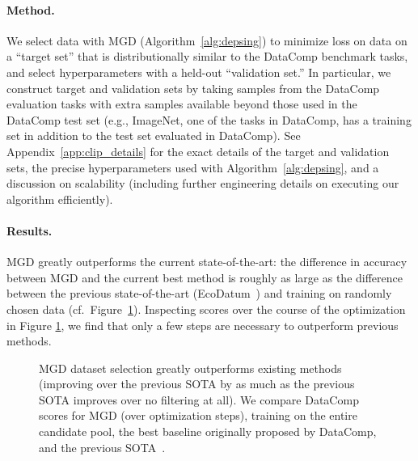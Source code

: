 \paragraph{Method.}
We select data with MGD (Algorithm~\ref{alg:depsing}) to minimize loss on
data on a ``target set'' that is distributionally similar to the DataComp
benchmark tasks, and select hyperparameters with a held-out ``validation
set.'' In particular, we construct target and validation sets by taking
samples from the DataComp evaluation tasks with extra samples available beyond
those used in the DataComp test set (e.g., ImageNet, one of the tasks in
DataComp, has a training set in addition to the test set evaluated in DataComp).
See Appendix~\ref{app:clip_details} for the exact details of the target and
validation sets, the precise hyperparameters used with
Algorithm~\ref{alg:depsing}, and a discussion on scalability (including further
engineering details on executing our algorithm efficiently).

\paragraph{Results.}
MGD greatly outperforms the current state-of-the-art: the difference in accuracy
between MGD and the current best method is roughly as large as the difference
between the previous state-of-the-art (EcoDatum~\citep{ecodatum2024ecodatum})
and training on randomly chosen data
(cf.\ Figure~\ref{fig:datacomp_score_over_time}).
Inspecting scores over the course of the optimization in Figure
\ref{fig:datacomp_score_over_time}, we find that only a few steps are necessary
to outperform previous methods.

\begin{figure}[ht]
  \centering
  \begin{subfigure}[t]{0.49\textwidth}
    \raisebox{-\height}{}
  \end{subfigure}
  \hfill
  \begin{subfigure}[t]{0.5\textwidth}
    
  \end{subfigure}
  \caption{MGD dataset selection greatly outperforms existing methods (improving
      over the previous SOTA by as much as the previous SOTA improves over no
    filtering at all). We compare DataComp scores for MGD (over
    optimization steps),
    training on the entire candidate pool, the best baseline
    originally proposed by
  DataComp, and the previous SOTA~\citep{ecodatum2024ecodatum}.}
  \label{fig:datacomp_score_over_time}
\end{figure}

